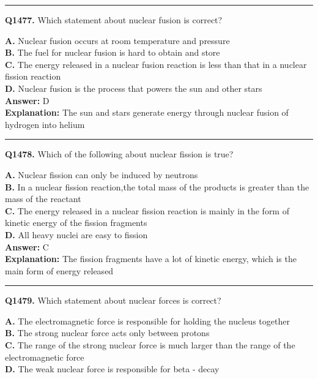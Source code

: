 \documentclass[12pt]{article}
\begin{document}
\hrule
\vspace{1em}


\noindent
\textbf{Q1477.} Which statement about nuclear fusion is correct?



\textbf{A.} Nuclear fusion occurs at room temperature and pressure \\
\textbf{B.} The fuel for nuclear fusion is hard to obtain and store \\
\textbf{C.} The energy released in a nuclear fusion reaction is less than that in a nuclear fission reaction \\
\textbf{D.} Nuclear fusion is the process that powers the sun and other stars \\

\textbf{Answer:} D \\
\textbf{Explanation:} The sun and stars generate energy through nuclear fusion of hydrogen into helium

\hrule
\vspace{1em}


\noindent
\textbf{Q1478.} Which of the following about nuclear fission is true?



\textbf{A.} Nuclear fission can only be induced by neutrons \\
\textbf{B.} In a nuclear fission reaction,the total mass of the products is greater than the mass of the reactant \\
\textbf{C.} The energy released in a nuclear fission reaction is mainly in the form of kinetic energy of the fission fragments \\
\textbf{D.} All heavy nuclei are easy to fission \\

\textbf{Answer:} C \\
\textbf{Explanation:} The fission fragments have a lot of kinetic energy, which is the main form of energy released

\hrule
\vspace{1em}


\noindent
\textbf{Q1479.} Which statement about nuclear forces is correct?



\textbf{A.} The electromagnetic force is responsible for holding the nucleus together \\
\textbf{B.} The strong nuclear force acts only between protons \\
\textbf{C.} The range of the strong nuclear force is much larger than the range of the electromagnetic force \\
\textbf{D.} The weak nuclear force is responsible for beta - decay \\
\end{document}
